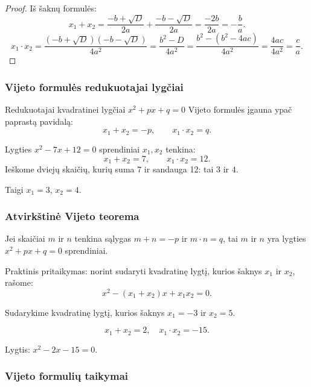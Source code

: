 \begin{proof}
Iš šaknų formulės:
\[
x_1 + x_2 = \frac{-b + \sqrt{D}}{2a} + \frac{-b - \sqrt{D}}{2a} = \frac{-2b}{2a} = -\frac{b}{a}.
\]
\[
x_1 \cdot x_2 = \frac{(-b + \sqrt{D})(-b - \sqrt{D})}{4a^2} = \frac{b^2 - D}{4a^2} = \frac{b^2 - (b^2 - 4ac)}{4a^2} = \frac{4ac}{4a^2} = \frac{c}{a}.
\]
\end{proof}

\subsubsection*{Vijeto formulės redukuotajai lygčiai}

Redukuotajai kvadratinei lygčiai $x^2 + px + q = 0$ Vijeto formulės įgauna ypač paprastą pavidalą:
\[
\boxed{x_1 + x_2 = -p, \qquad x_1 \cdot x_2 = q.}
\]

\begin{example}
Lygties $x^2 - 7x + 12 = 0$ sprendiniai $x_1, x_2$ tenkina:
\[
x_1 + x_2 = 7, \qquad x_1 \cdot x_2 = 12.
\]
Ieškome dviejų skaičių, kurių suma 7 ir sandauga 12: tai $3$ ir $4$.

Taigi $x_1 = 3$, $x_2 = 4$.
\end{example}

\subsubsection*{Atvirkštinė Vijeto teorema}

\begin{theorem}
Jei skaičiai $m$ ir $n$ tenkina sąlygas $m + n = -p$ ir $m \cdot n = q$, tai $m$ ir $n$ yra lygties $x^2 + px + q = 0$ sprendiniai.
\end{theorem}

Praktinis pritaikymas: norint sudaryti kvadratinę lygtį, kurios šaknys $x_1$ ir $x_2$, rašome:
\[
x^2 - (x_1 + x_2)x + x_1 x_2 = 0.
\]

\begin{example}
Sudarykime kvadratinę lygtį, kurios šaknys $x_1 = -3$ ir $x_2 = 5$.

\[
x_1 + x_2 = 2, \quad x_1 \cdot x_2 = -15.
\]

Lygtis: $x^2 - 2x - 15 = 0$.
\end{example}

\subsubsection*{Vijeto formulių taikymai}

